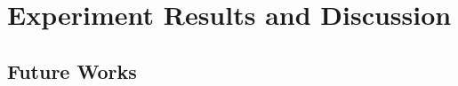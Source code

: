 \chapter{Experiment Results and Discussion}
\label{ch4:results_analysis}

\section{Future Works}
\label{sec4.2:future_work}